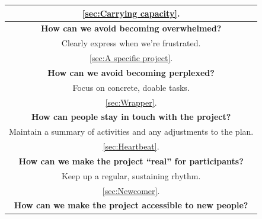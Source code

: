 \begin{table}
{\begin{tabularx}{\textwidth}{|C|}
\vspace{-.4em} \color{Black} \ref{sec:Carrying capacity}. \vspace{.4em}\\
\hline
\vspace{.01em}
\textbf{How can we avoid becoming overwhelmed?}\\
Clearly express when we're frustrated.
\vspace{.4em}\\
\hline
\vspace{-.4em} \color{Black} \ref{sec:A specific project}. \vspace{.4em}\\
\hline
\vspace{.01em}
\textbf{How can we avoid becoming perplexed?}\\
Focus on concrete, doable tasks.
\vspace{.4em}\\
\hline
\vspace{-.4em} \color{Black} \ref{sec:Wrapper}. \vspace{.4em}\\
\hline
\vspace{.01em}
\textbf{How can people stay in touch with the project?}\\
Maintain a summary of activities and any adjustments to the plan.
\vspace{.4em}\\
\hline
\vspace{-.4em} \color{Black} \ref{sec:Heartbeat}. \vspace{.4em}\\
\hline
\vspace{.01em}
\textbf{How can we make the project ``real'' for participants?}\\
Keep up a regular, sustaining rhythm.
\vspace{.4em}\\
\hline
\vspace{-.4em} \color{Black} \ref{sec:Newcomer}. \vspace{.4em}\\
\hline
\vspace{.01em}
\textbf{How can we make the project accessible to new people?}\\

\end{tabularx}}
\end{table}
